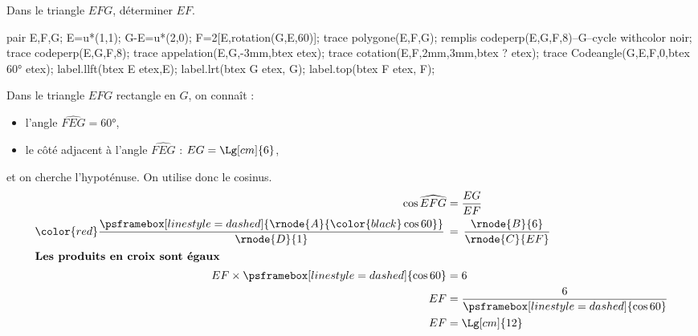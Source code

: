 \begin{methode*1}
    \exercice    
    Dans le triangle $EFG$, déterminer $EF$.\\
    \begin{Geometrie}[CoinHD={(4u,5u)}]        
        pair E,F,G;
        E=u*(1,1);
        G-E=u*(2,0);
        F=2[E,rotation(G,E,60)];
        trace polygone(E,F,G);
        remplis codeperp(E,G,F,8)--G--cycle withcolor noir;
        trace codeperp(E,G,F,8);
        trace appelation(E,G,-3mm,btex  etex);        
        trace cotation(E,F,2mm,3mm,btex ? etex);        
        trace Codeangle(G,E,F,0,btex \ang{60} etex);
        label.llft(btex E etex,E);
        label.lrt(btex G etex, G);
        label.top(btex F etex, F);
    \end{Geometrie}
    \correction
    Dans le triangle $EFG$ rectangle en $G$, on connaît :
    \begin{itemize}
        \item l'angle $\widehat{FEG}=\ang{60}$,
        \item le côté adjacent à l'angle $\widehat{FEG}$ : $EG=\Lg[cm]{6}$,
    \end{itemize}
    et on cherche l'hypoténuse. On utilise donc le cosinus.
    \begin{align*}
        \cos\widehat{EFG}&=\frac{EG}{EF}\\
        {\color{red}\frac{\psframebox[linestyle=dashed]{\rnode{A}{\color{black}\cos60}}}{\rnode{D}{1}}}\,&=\,\frac{\rnode{B}{6}}{\rnode{C}{EF}}\\
        \intertext{\centering\bf Les produits en croix sont égaux}
        EF\times\psframebox[linestyle=dashed]{\cos60}&=6\\
        EF&=\frac{6}{\psframebox[linestyle=dashed]{\cos60}}\\
        EF&=\Lg[cm]{12}
    \end{align*}
\end{methode*1}

